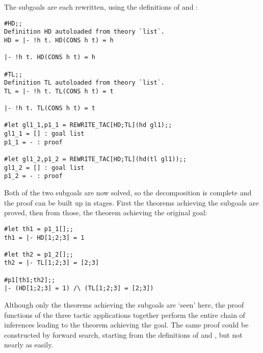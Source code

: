 \noindent The subgoals are each rewritten, using the definitions of
 and :

\begin{session}\begin{verbatim}
#HD;;
Definition HD autoloaded from theory `list`.
HD = |- !h t. HD(CONS h t) = h

|- !h t. HD(CONS h t) = h

#TL;;
Definition TL autoloaded from theory `list`.
TL = |- !h t. TL(CONS h t) = t

|- !h t. TL(CONS h t) = t

#let gl1_1,p1_1 = REWRITE_TAC[HD;TL](hd gl1);;
gl1_1 = [] : goal list
p1_1 = - : proof

#let gl1_2,p1_2 = REWRITE_TAC[HD;TL](hd(tl gl1));;
gl1_2 = [] : goal list
p1_2 = - : proof
\end{verbatim}\end{session}

\noindent Both of the two subgoals are now solved, so
the decomposition is complete and
the proof can be built up in stages.  First the theorems achieving the
subgoals are proved, then from those, the theorem achieving the original goal:
\vfill
\newpage
\begin{session}\begin{verbatim}
#let th1 = p1_1[];;
th1 = |- HD[1;2;3] = 1

#let th2 = p1_2[];;
th2 = |- TL[1;2;3] = [2;3]

#p1[th1;th2];;
|- (HD[1;2;3] = 1) /\ (TL[1;2;3] = [2;3])
\end{verbatim}\end{session}

\noindent Although only the theorems achieving the subgoals are `seen' here,
the proof functions of the three tactic applications together perform
the entire chain
 of inferences leading to the theorem achieving the goal.
The same proof could be constructed by forward search, starting from
the definitions of  and , but not nearly as easily.

